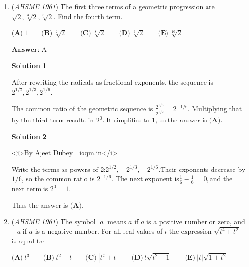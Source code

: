 \begin{enumerate}
<i>By Ajeet Dubey | \href{https://ioqm.in}{ioqm.in}</i>

 Let the third tangent meet $AB$ and $AC$ at $P$ and $R$, and touch the circle at $Q$. Tangent segments from the same external point are equal, so$AB=AC=20,\qquad PB=PQ,\qquad RC=RQ.$Hence$AP=20-PQ, \qquad AR=20-RQ, \qquad PR=PQ+RQ.$The perimeter of $\triangle APR$ is therefore$AP+AR+PR=(20-PQ)+(20-RQ)+(PQ+RQ)=40.$

 Thus the answer is $\boxed{\textbf{(C)}}$.

 


	\item (\textit{AHSME 1961}) The first three terms of a geometric progression are $\sqrt{2}, \sqrt[3]{2}, \sqrt[6]{2}$. Find the fourth term.


 $\textbf{(A)}\ 1\qquad \textbf{(B)}\ \sqrt[7]{2}\qquad \textbf{(C)}\ \sqrt[8]{2}\qquad \textbf{(D)}\ \sqrt[9]{2}\qquad \textbf{(E)}\ \sqrt[10]{2}$

 \textbf{Answer: }A



\textbf{Solution 1}

After rewriting the radicals as fractional exponents, the sequence is $2^{1/2}, 2^{1/3}, 2^{1/6}$.

 The common ratio of the \href{https://artofproblemsolving.com/wiki/index.php?title=Geometric\_sequence}{geometric sequence} is $\frac{2^{1/3}}{2^{1/2}} = 2^{-1/6}$.  Multiplying that by the third term results in $2^0$.  It simplifies to $1$, so the answer is $\boxed{\textbf{(A)}}$.

 



\textbf{Solution 2}

<i>By Ajeet Dubey | \href{https://ioqm.in}{ioqm.in}</i>

 Write the terms as powers of $2$:$2^{1/2},\quad 2^{1/3},\quad 2^{1/6}.$Their exponents decrease by $1/6$, so the common ratio is $2^{-1/6}$. The next exponent is$\frac16-\frac16=0,$and the next term is $2^0=1$.

 Thus the answer is $\boxed{\textbf{(A)}}$.

 


	\item (\textit{AHSME 1961}) The symbol $|a|$ means $a$ if $a$ is a positive number or zero, and $-a$ if $a$ is a negative number. 
For all real values of $t$ the expression $\sqrt{t^4+t^2}$ is equal to:


 $\textbf{(A)}\ t^3\qquad \textbf{(B)}\ t^2+t\qquad \textbf{(C)}\ |t^2+t|\qquad \textbf{(D)}\ t\sqrt{t^2+1}\qquad \textbf{(E)}\ |t|\sqrt{1+t^2}$


\end{enumerate}
